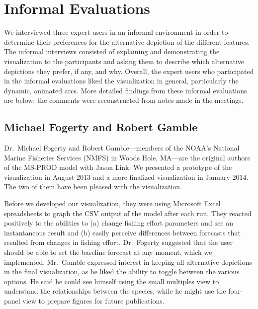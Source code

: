 \section{Informal Evaluations}

We interviewed three expert users in an informal environment in order to determine their preferences for the alternative depiction of the different features.  The informal interviews consisted of explaining and demonstrating the visualization to the participants and asking them to describe which alternative depictions they prefer, if any, and why.  Overall, the expert users who participated in the informal evaluations liked the visualization in general, particularly the dynamic, animated arcs.  More detailed findings from these informal evaluations are below; the comments were reconstructed from notes made in the meetings.

\subsection{Michael Fogerty and Robert Gamble} %

Dr.\ Michael Fogerty and Robert Gamble---members of the NOAA's National Marine Fisheries Services (NMFS) in Woods Hole, MA---are the original authors of the MS-PROD model with Jason Link.  We presented a prototype of the visualization in August 2013 and a more finalized visualization in January 2014.  The two of them have been pleased with the visualization.

Before we developed our visualization, they were using Microsoft Excel spreadsheets to graph the CSV output of the model after each run.  They reacted positively to the abilities to (a) change fishing effort parameters and see an instantaneous result and (b) easily perceive differences between forecasts that resulted from changes in fishing effort.  Dr.\ Fogerty suggested that the user should be able to set the baseline forecast at any moment, which we implemented.  Mr.\ Gamble expressed interest in keeping all alternative depictions in the final visualization, as he liked the ability to toggle between the various options.  He said he could see himself using the small multiples view to understand the relationships between the species, while he might use the four-panel view to prepare figures for future publications.

